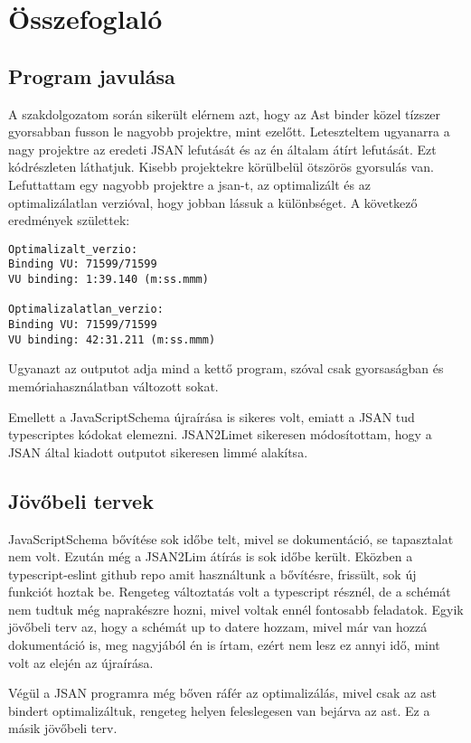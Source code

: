 \chapter{Összefoglaló}\label{chap:Összefoglaló}

\section{Program javulása}

\noindent

A szakdolgozatom során sikerült elérnem azt, hogy az Ast binder közel tízszer gyorsabban fusson le nagyobb projektre, mint ezelőtt.
Leteszteltem ugyanarra a nagy projektre az eredeti JSAN lefutását és az én általam átírt lefutását. Ezt  kódrészleten láthatjuk.
Kisebb projektekre körülbelül ötszörös gyorsulás van.
Lefuttattam egy nagyobb projektre a jsan-t, az optimalizált és az optimalizálatlan verzióval, hogy jobban lássuk a különbséget. A következő eredmények születtek:

\begin{lstlisting}[caption={JSAN lefutási idő előtte és utána}, label={lst:jsan_before_after_comparison}]
Optimalizalt_verzio:
Binding VU: 71599/71599
VU binding: 1:39.140 (m:ss.mmm)

Optimalizalatlan_verzio:
Binding VU: 71599/71599
VU binding: 42:31.211 (m:ss.mmm)
\end{lstlisting}

Ugyanazt az outputot adja mind a kettő program, szóval csak gyorsaságban és memóriahasználatban változott sokat.

Emellett a JavaScriptSchema újraírása is sikeres volt, emiatt a JSAN tud typescriptes kódokat elemezni.
JSAN2Limet sikeresen módosítottam, hogy a JSAN által kiadott outputot sikeresen limmé alakítsa.
\section{Jövőbeli tervek}

\noindent

JavaScriptSchema bővítése sok időbe telt, mivel se dokumentáció, se tapasztalat nem volt. Ezután még a JSAN2Lim átírás is sok időbe került.
Eközben a typescript-eslint github repo amit használtunk a bővítésre, frissült, sok új funkciót hoztak be.
Rengeteg változtatás volt a typescript résznél, de a schémát nem tudtuk még naprakészre hozni, mivel voltak ennél fontosabb feladatok.
Egyik jövőbeli terv az, hogy a schémát up to datere hozzam, mivel már van hozzá dokumentáció is, meg nagyjából én is írtam, ezért nem lesz ez annyi idő, mint volt az elején az újraírása.

\noindent

Végül a JSAN programra még bőven ráfér az optimalizálás, mivel csak az ast bindert optimalizáltuk, rengeteg helyen feleslegesen van bejárva az ast.
Ez a másik jövőbeli terv.

